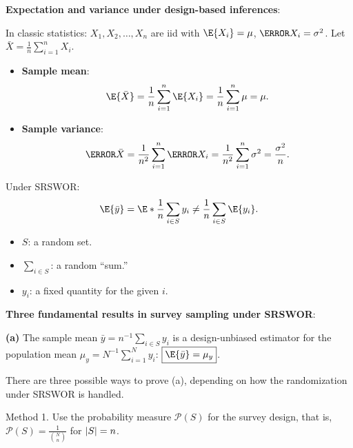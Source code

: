 \textbf{Expectation and variance under design-based inferences}:

In classic statistics: $ X_1,X_2,\ldots,X_n $ are iid with $ \E{X_i}=\mu $,
$ \V{X_i}=\sigma^2 $. Let $ \bar{X}=\frac{1}{n}\sum_{i=1}^{n}X_i $.
\begin{itemize}
      \item \textbf{Sample mean}:
            \[ \E{\bar{X}}=\frac{1}{n}\sum_{i=1}^{n}\E{X_i}=\frac{1}{n}\sum_{i=1}^{n}\mu=\mu. \]
      \item \textbf{Sample variance}:
            \[ \V{\bar{X}}=\frac{1}{n^2}\sum_{i=1}^{n}\V{X_i}=\frac{1}{n^2}\sum_{i=1}^{n}\sigma^2=\frac{\sigma^2}{n}. \]
\end{itemize}
Under SRSWOR\@:
\[ \E{\bar{y}}=\E*{\frac{1}{n}\sum_{i\in S}y_i}\ne \frac{1}{n}\sum_{i\in S}\E{y_i}. \]
\begin{itemize}
      \item $ S $: a random set.
      \item $ \sum_{i\in S} $: a random ``sum.''
      \item $ y_i $: a fixed quantity for the given $ i $.
\end{itemize}

\textbf{Three fundamental results in survey sampling under SRSWOR}:

\textbf{(a)} The sample mean $ \bar{y}=n^{-1}\sum_{i\in S}y_i $
is a design-unbiased estimator for the population
mean $ \mu_y=N^{-1}\sum_{i=1}^{N}y_i $: $ \boxed{\E{\bar{y}}=\mu_y} $.

There are three possible ways to prove (a), depending on how
the randomization under SRSWOR is handled.

Method 1. Use the probability measure $ \mathcal{P}(S) $
for the survey design, that is, $ \mathcal{P}(S)=\frac{1}{\binom{N}{n}} $
for $ \lvert S\rvert=n $.

